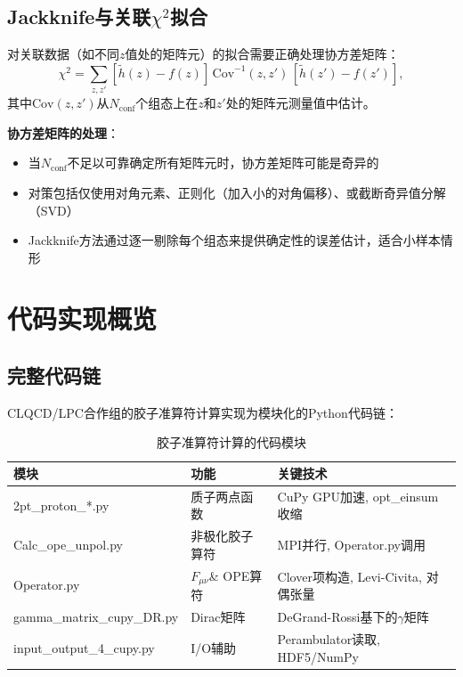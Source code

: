 \documentclass[12pt,a4paper]{ctexart}
\theoremstyle{definition}
\begin{document}
\subsection{Jackknife与关联$\chi^2$拟合}

对关联数据（如不同$z$值处的矩阵元）的拟合需要正确处理协方差矩阵\cite{Gattringer2010,本库补充6}：
\begin{equation}
\chi^2 = \sum_{z,z'} [\tilde{h}(z) - f(z)] \, \text{Cov}^{-1}(z,z') \, [\tilde{h}(z') - f(z')],
\end{equation}
其中$\text{Cov}(z,z')$从$N_{\text{conf}}$个组态上在$z$和$z'$处的矩阵元测量值中估计。

\textbf{协方差矩阵的处理}\cite{本库补充6}：
\begin{itemize}
    \item 当$N_{\text{conf}}$不足以可靠确定所有矩阵元时，协方差矩阵可能是奇异的
    \item 对策包括仅使用对角元素、正则化（加入小的对角偏移）、或截断奇异值分解（SVD）
    \item Jackknife方法通过逐一剔除每个组态来提供确定性的误差估计，适合小样本情形
\end{itemize}

\section{代码实现概览}

\subsection{完整代码链}

CLQCD/LPC合作组的胶子准算符计算实现为模块化的Python代码链\cite{代码解析}：

\begin{table}[H]
\centering
\caption{胶子准算符计算的代码模块}
\label{tab:code_modules}
\begin{tabular}{llp{6cm}}
\toprule
\textbf{模块} & \textbf{功能} & \textbf{关键技术} \\
\midrule
2pt\_proton\_*.py & 质子两点函数 & CuPy GPU加速, opt\_einsum收缩 \\
Calc\_ope\_unpol.py & 非极化胶子算符 & MPI并行, Operator.py调用 \\
Operator.py & $F_{\mu\nu}$\& OPE算符 & Clover项构造, Levi-Civita, 对偶张量 \\
gamma\_matrix\_cupy\_DR.py & Dirac矩阵 & DeGrand-Rossi基下的$\gamma$矩阵 \\
input\_output\_4\_cupy.py & I/O辅助 & Perambulator读取, HDF5/NumPy \\
\bottomrule
\end{tabular}
\end{table}
\end{document}
